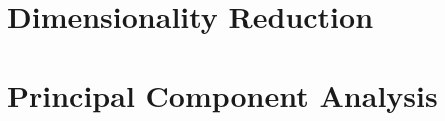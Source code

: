 \documentclass[]{article}
\begin{document}


\Large
\tableofcontents
\newpage
\section{Dimensionality Reduction}






\newpage
\section{Principal Component Analysis }
\end{document}
